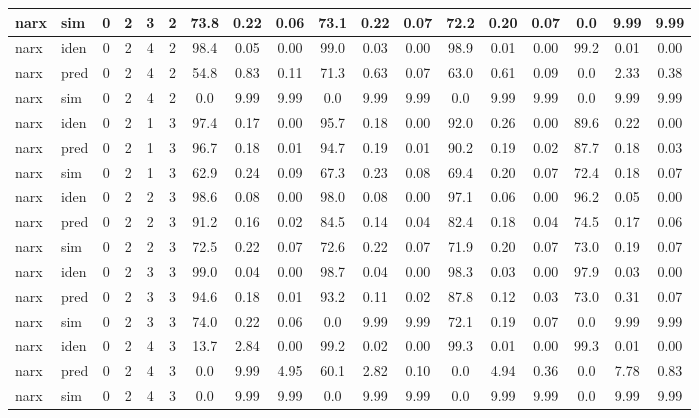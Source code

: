 \begin{landscape}
\begin{center}
\begin{longtable}{ll|cccc|ccc|ccc|ccc|ccc}
narx & sim  & 0 & 2 & 3 & 2 & 73.8 & 0.22 & 0.06 & 73.1 & 0.22 & 0.07 & 72.2 & 0.20 & 0.07 & 0.0 & 9.99 & 9.99 \\ 
 \hline 
narx & iden & 0 & 2 & 4 & 2 & 98.4 & 0.05 & 0.00 & 99.0 & 0.03 & 0.00 & 98.9 & 0.01 & 0.00 & 99.2 & 0.01 & 0.00 \\ 
narx & pred & 0 & 2 & 4 & 2 & 54.8 & 0.83 & 0.11 & 71.3 & 0.63 & 0.07 & 63.0 & 0.61 & 0.09 & 0.0 & 2.33 & 0.38 \\ 
narx & sim  & 0 & 2 & 4 & 2 & 0.0 & 9.99 & 9.99 & 0.0 & 9.99 & 9.99 & 0.0 & 9.99 & 9.99 & 0.0 & 9.99 & 9.99 \\ 
 \hline 
narx & iden & 0 & 2 & 1 & 3 & 97.4 & 0.17 & 0.00 & 95.7 & 0.18 & 0.00 & 92.0 & 0.26 & 0.00 & 89.6 & 0.22 & 0.00 \\ 
narx & pred & 0 & 2 & 1 & 3 & 96.7 & 0.18 & 0.01 & 94.7 & 0.19 & 0.01 & 90.2 & 0.19 & 0.02 & 87.7 & 0.18 & 0.03 \\ 
narx & sim  & 0 & 2 & 1 & 3 & 62.9 & 0.24 & 0.09 & 67.3 & 0.23 & 0.08 & 69.4 & 0.20 & 0.07 & 72.4 & 0.18 & 0.07 \\ 
 \hline 
narx & iden & 0 & 2 & 2 & 3 & 98.6 & 0.08 & 0.00 & 98.0 & 0.08 & 0.00 & 97.1 & 0.06 & 0.00 & 96.2 & 0.05 & 0.00 \\ 
narx & pred & 0 & 2 & 2 & 3 & 91.2 & 0.16 & 0.02 & 84.5 & 0.14 & 0.04 & 82.4 & 0.18 & 0.04 & 74.5 & 0.17 & 0.06 \\ 
narx & sim  & 0 & 2 & 2 & 3 & 72.5 & 0.22 & 0.07 & 72.6 & 0.22 & 0.07 & 71.9 & 0.20 & 0.07 & 73.0 & 0.19 & 0.07 \\ 
 \hline 
narx & iden & 0 & 2 & 3 & 3 & 99.0 & 0.04 & 0.00 & 98.7 & 0.04 & 0.00 & 98.3 & 0.03 & 0.00 & 97.9 & 0.03 & 0.00 \\ 
narx & pred & 0 & 2 & 3 & 3 & 94.6 & 0.18 & 0.01 & 93.2 & 0.11 & 0.02 & 87.8 & 0.12 & 0.03 & 73.0 & 0.31 & 0.07 \\ 
narx & sim  & 0 & 2 & 3 & 3 & 74.0 & 0.22 & 0.06 & 0.0 & 9.99 & 9.99 & 72.1 & 0.19 & 0.07 & 0.0 & 9.99 & 9.99 \\ 
 \hline 
narx & iden & 0 & 2 & 4 & 3 & 13.7 & 2.84 & 0.00 & 99.2 & 0.02 & 0.00 & 99.3 & 0.01 & 0.00 & 99.3 & 0.01 & 0.00 \\ 
narx & pred & 0 & 2 & 4 & 3 & 0.0 & 9.99 & 4.95 & 60.1 & 2.82 & 0.10 & 0.0 & 4.94 & 0.36 & 0.0 & 7.78 & 0.83 \\ 
narx & sim  & 0 & 2 & 4 & 3 & 0.0 & 9.99 & 9.99 & 0.0 & 9.99 & 9.99 & 0.0 & 9.99 & 9.99 & 0.0 & 9.99 & 9.99 \\ 
 \hline 
\end{longtable} 
\normalsize
\end{center} 
 \end{landscape}